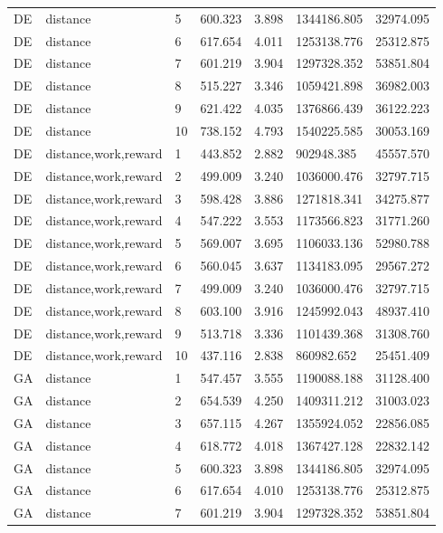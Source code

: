 \documentclass{tamuccthesis}
\begin{document}
\begin{appendices}
\begin{small}
\begin{longtable}{lllllll}
DE  & distance    & 5   & 600.323 & 3.898 & 1344186.805 & 32974.095 \\
DE  & distance    & 6   & 617.654 & 4.011 & 1253138.776 & 25312.875 \\
DE  & distance    & 7   & 601.219 & 3.904 & 1297328.352 & 53851.804 \\
DE  & distance    & 8   & 515.227 & 3.346 & 1059421.898 & 36982.003 \\
DE  & distance    & 9   & 621.422 & 4.035 & 1376866.439 & 36122.223 \\
DE  & distance    & 10  & 738.152 & 4.793 & 1540225.585 & 30053.169 \\
DE  & distance,work,reward  & 1  & 443.852 & 2.882 & 902948.385  & 45557.570 \\
DE  & distance,work,reward  & 2  & 499.009 & 3.240 & 1036000.476 & 32797.715 \\
DE  & distance,work,reward  & 3  & 598.428 & 3.886 & 1271818.341 & 34275.877 \\
DE  & distance,work,reward  & 4  & 547.222 & 3.553 & 1173566.823 & 31771.260 \\
DE  & distance,work,reward  & 5  & 569.007 & 3.695 & 1106033.136 & 52980.788 \\
DE  & distance,work,reward  & 6  & 560.045 & 3.637 & 1134183.095 & 29567.272 \\
DE  & distance,work,reward  & 7  & 499.009 & 3.240 & 1036000.476 & 32797.715 \\
DE  & distance,work,reward  & 8  & 603.100 & 3.916 & 1245992.043 & 48937.410 \\
DE  & distance,work,reward  & 9  & 513.718 & 3.336 & 1101439.368 & 31308.760 \\
DE  & distance,work,reward  & 10 & 437.116 & 2.838 &  860982.652 & 25451.409 \\
GA & distance    & 1   & 547.457 & 3.555 & 1190088.188 & 31128.400 \\
GA & distance    & 2   & 654.539 & 4.250 & 1409311.212 & 31003.023  \\
GA & distance    & 3   & 657.115 & 4.267 & 1355924.052 & 22856.085 \\
GA & distance    & 4   & 618.772 & 4.018 & 1367427.128 & 22832.142 \\
GA & distance    & 5   & 600.323 & 3.898 & 1344186.805 & 32974.095 \\
GA & distance    & 6   & 617.654 & 4.010 & 1253138.776 & 25312.875 \\
GA & distance    & 7   & 601.219 & 3.904 & 1297328.352 & 53851.804 \\

\end{longtable}
\end{small}
\end{appendices}
\end{document}
